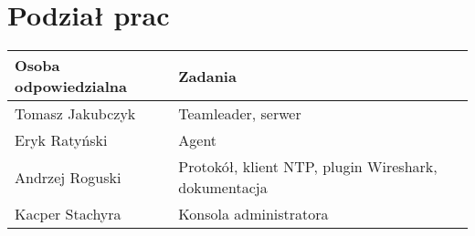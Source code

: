 \documentclass[10pt,a4paper]{article}
\begin{document}
	\section{Podział prac}
	
	    \begin{tabular}{ l | l }
		    \textbf{Osoba odpowiedzialna} & \textbf{Zadania} \\
		    \hline
		    Tomasz Jakubczyk  & Teamleader, serwer  \\
		    Eryk Ratyński  & Agent  \\
		    Andrzej Roguski  & Protokół, klient NTP, plugin Wireshark, dokumentacja \\
		    Kacper Stachyra & Konsola administratora \\
		\end{tabular}  
		
\end{document}
